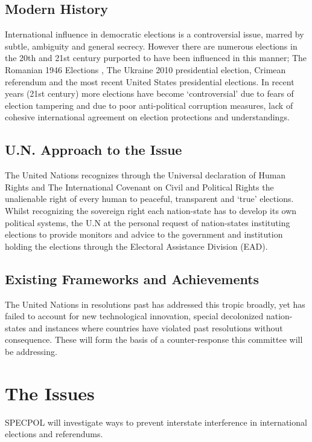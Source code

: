 \documentclass[11pt,a4paper]{report}
\begin{document}
\subsection{Modern History}

International influence in democratic elections is a controversial issue, marred by subtle, ambiguity and general secrecy. However there are numerous elections in the 20th and 21st century purported to have been influenced in this manner; The Romanian 1946 Elections , The Ukraine 2010 presidential election, Crimean referendum and the most recent United States presidential elections. In recent years (21st century) more elections have become `controversial' due to fears of election tampering and due to poor anti-political corruption measures, lack of cohesive international agreement on election protections and understandings. 

\subsection{U.N. Approach to the Issue}

The United Nations recognizes through the Universal declaration of Human Rights and The International Covenant on Civil and Political Rights the unalienable right of every human to peaceful, transparent and `true' elections. Whilst recognizing the sovereign right each nation-state has to develop its own political systems, the U.N at the personal request of nation-states instituting elections to provide monitors and advice to the government and institution holding the elections through the Electoral Assistance Division (EAD).

\subsection{Existing Frameworks and Achievements}
The United Nations in resolutions past has addressed this tropic broadly, yet has failed to account for new technological innovation, special decolonized nation-states and instances where countries have violated past resolutions without consequence.  These will form the basis of a counter-response this committee will be addressing. 

\section{The Issues}

SPECPOL will investigate ways to prevent interstate interference in international elections and referendums.
\end{document}
